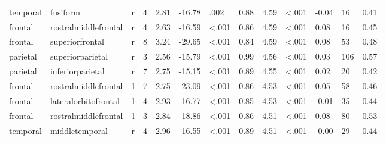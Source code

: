 \documentclass{article}
\begin{document}
\begin{longtable}{llrR{1.3cm}R{1cm}R{1.3cm}R{1cm}R{1cm}R{1.3cm}R{1cm}R{1.8cm}R{1.3cm}R{1.8cm}}
  temporal &                  fusiform &    r &         4 &                  2.81 &           -16.78 &               .002 &                               0.88 &                          4.59 &                   \textless.001 &  -0.04 &     16 &      0.41 \\
   frontal &      rostralmiddlefrontal &    r &         4 &                  2.63 &           -16.59 &      \textless.001 &                               0.86 &                          4.59 &                   \textless.001 &   0.08 &     16 &      0.45 \\
   frontal &           superiorfrontal &    r &         8 &                  3.24 &           -29.65 &      \textless.001 &                               0.84 &                          4.59 &                   \textless.001 &   0.08 &     53 &      0.48 \\
  parietal &          superiorparietal &    r &         3 &                  2.56 &           -15.79 &      \textless.001 &                               0.99 &                          4.56 &                   \textless.001 &   0.03 &    106 &      0.57 \\
  parietal &          inferiorparietal &    r &         7 &                  2.75 &           -15.15 &      \textless.001 &                               0.89 &                          4.55 &                   \textless.001 &   0.02 &     20 &      0.42 \\
   frontal &      rostralmiddlefrontal &    l &         7 &                  2.75 &           -23.09 &      \textless.001 &                               0.86 &                          4.53 &                   \textless.001 &   0.05 &     58 &      0.46 \\
   frontal &      lateralorbitofrontal &    l &         4 &                  2.93 &           -16.77 &      \textless.001 &                               0.85 &                          4.53 &                   \textless.001 &  -0.01 &     35 &      0.44 \\
   frontal &      rostralmiddlefrontal &    l &         3 &                  2.84 &           -18.86 &      \textless.001 &                               0.86 &                          4.51 &                   \textless.001 &   0.08 &     80 &      0.53 \\
  temporal &            middletemporal &    r &         4 &                  2.96 &           -16.55 &      \textless.001 &                               0.89 &                          4.51 &                   \textless.001 &  -0.00 &     29 &      0.44 \\

\end{longtable}
\end{document}
